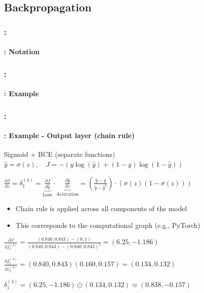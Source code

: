 \documentclass[xcolor=table]{beamer}
\begin{document}
\subsection{Backpropagation} %

\begin{frame}
	\frametitle{\insertshortsubtitle: \insertsection}
	\framesubtitle{\insertsubsection: Notation}
	
	
\end{frame}

\begin{frame}
	\frametitle{\insertshortsubtitle: \insertsection}
	\framesubtitle{\insertsubsection: Example}
	
	
\end{frame}

\begin{frame}
	\frametitle{\insertshortsubtitle: \insertsection}
	\framesubtitle{\insertsubsection: Example - Output layer (chain rule)}
	
	\begin{exampleblock}{Sigmoid + BCE (separate functions)}
		\centering
		$\hat{y} = \sigma(z), \quad
		J = - (y \log(\hat{y}) + (1-y)\log(1-\hat{y}))$
		
		$
		\frac{\partial J}{\partial z} = \delta_{1}^{(4)} =
		\underbrace{\frac{\partial J}{\partial \hat{y}}}_{\text{Loss}}
		\cdot
		\underbrace{\frac{\partial \hat{y}}{\partial z}}_{\text{Activation}}
		= 
		(\frac{\hat{y} - y}{\hat{y} - \hat{y}^2}) \cdot (\sigma(z) (1- \sigma(z)))
		$
	\end{exampleblock}
	
	\begin{itemize}
		\item Chain rule is applied across all components of the model
		\item This corresponds to the computational graph (e.g., PyTorch)
	\end{itemize}
	
	
	$ 
	\frac{\partial J}{\partial f_{1}^{(4)}} = \frac{(0.840, 0.843) - (0, 1)}{(0.840, 0.843) - (0.840, 0.843)^2} 
	= (6.25, -1.186)
	$
	
	$ 
	\frac{\partial f_{1}^{(4)}}{\partial z_{1}^{(4)}} = (0.840, 0.843) (0.160, 0.157) = (0.134, 0.132)
	$
	
	$
	\delta_{1}^{(4)} = (6.25, -1.186) \odot (0.134, 0.132) \approx (0.838, -0.157)
	$
	
	
\end{frame}
\end{document}
